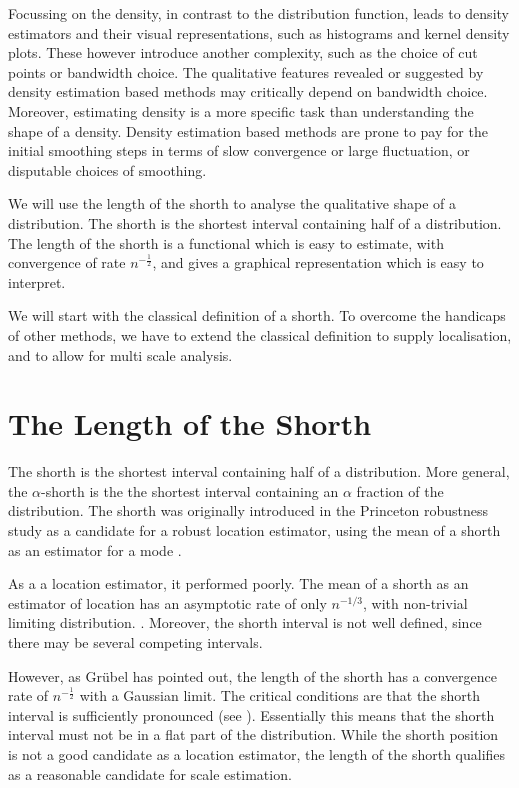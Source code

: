 \documentclass[dvips,12pt,a4paper,twoside]{amsart}
\begin{document}
Focussing on the density, in contrast to the distribution function, leads to density estimators and their visual representations, such as histograms and kernel density plots. These however introduce another complexity, such as the choice of cut points or bandwidth choice. The qualitative features revealed or suggested by density estimation based methods may critically depend on bandwidth choice. Moreover, estimating density is a more specific task than understanding the shape of a density. Density estimation based methods are prone to pay for the initial smoothing steps in terms of slow convergence or large fluctuation, or disputable choices of smoothing.

We will use the length of the shorth to analyse the qualitative shape of a distribution. The shorth is the shortest interval containing half of a distribution. The length of the shorth is a functional which is easy to estimate, with convergence of rate $n^{-\frac{1}{2}}$, and gives a graphical representation which is easy to interpret. 

We will start with the classical definition of a shorth. To overcome the handicaps of other methods, we have to extend the classical definition to supply localisation, and to allow for multi scale analysis.

%
\section{The Length of the Shorth}
The shorth is the shortest interval containing half of a distribution. More general, the $\alpha$-shorth is the the shortest interval containing an $\alpha$ fraction of the distribution. The shorth was originally introduced in the Princeton robustness study as a candidate for a robust location estimator, using the mean of a shorth as an estimator for a mode \cite{ANDREWSD1972Robust-Estimati}. 

As a a location estimator, it performed poorly. The mean of a shorth as an estimator of
location has an asymptotic rate of only $n ^{-1/ 3}$,
with non-trivial limiting
distribution. 
\cite[p. 50]{ANDREWSD1972Robust-Estimati}  \cite[p. 767]{Shorack1986Empirical-proce}. Moreover, the shorth interval is not well defined, since there may be several competing intervals. 


However, as Gr\"ubel \cite{grbl88lshrt} has pointed out, the length of the shorth has a convergence rate of $n^{-\frac{1}{2}}$ with a Gaussian limit. The critical conditions are that the shorth interval is sufficiently pronounced (see \cite[section 3.3]{grbl88lshrt}).  Essentially this means that the shorth interval must not be in a flat part of the distribution. While the shorth position is not a good candidate as a location estimator, the length of the shorth qualifies as a reasonable candidate for scale estimation.
\end{document}
